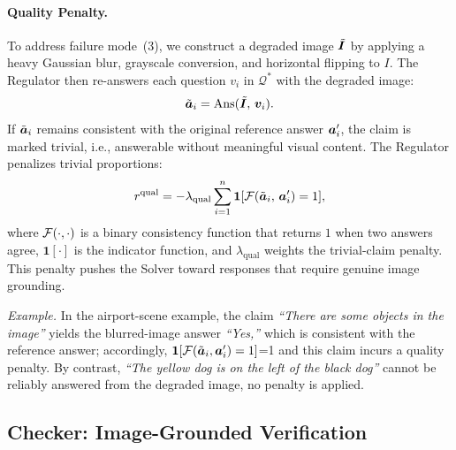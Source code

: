 \paragraph{Quality Penalty.}
To address failure mode~(3), we construct a degraded image
$\tilde{{\bm{I}}}$ by applying a heavy Gaussian blur, grayscale conversion, and
horizontal flipping to $I$.
The Regulator then re-answers each question $v_i$ in $\mathcal{Q}^{\ast}$ with the
degraded image:
\begin{equation}
    \tilde{{\bm{a}}}_i = \text{Ans}(\tilde{{\bm{I}}},\, {\bm{v}}_i).
\end{equation}
If $\tilde{{\bm{a}}}_i$ remains consistent with the original reference answer
${\bm{a}}_i'$, the claim is marked trivial, i.e., answerable without meaningful visual content.
The Regulator penalizes trivial proportions:
\begin{equation}
    r^{\text{qual}} = -\lambda_{\text{qual}} \sum_{i=1}^{n} \bm{1}[
       {\mathcal{F}}(\tilde{{\bm{a}}}_i,\, {\bm{a}}_i') = 1],
\end{equation}
where ${\mathcal{F}}(\cdot,\cdot)$ is a binary consistency function that returns $1$ when two answers agree, $\bm{1}[\cdot]$ is the indicator function, and $\lambda_{\text{qual}}$ weights the trivial-claim penalty.
This penalty pushes the Solver toward responses that require genuine image grounding.

\smallskip
\noindent\textit{Example.}
In the airport-scene example, the claim \textit{``There are some objects in the image''} yields the blurred-image answer \textit{``Yes,''} which is consistent with the reference answer; accordingly, $\bm{1} [{\mathcal{F}}(\tilde{{\bm{a}}}_i,  {\bm{a}}_i') = 1]$=1 and this claim incurs a quality penalty.
By contrast, \textit{``The yellow dog is on the left of the black dog''} cannot be reliably answered from the degraded image, no penalty is applied.


\subsection{Checker: Image-Grounded Verification}
\label{sec:checker}

